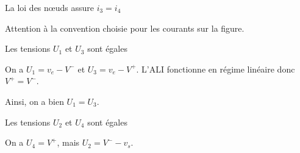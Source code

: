 
\begin{enonce}
  La loi des nœuds assure \(i_{3} = i_{4}\)
\end{enonce}


\begin{corrige}
  Attention à la convention choisie pour les courants sur la figure.
\end{corrige}




\begin{enonce}
  Les tensions \(U_{1}\) et \(U_{3}\) sont égales
\end{enonce}


\begin{corrige}
  On a \(U_{1} = v_{e} - V^{-}\) et \(U_{3} = v_{e} - V^{+}\). L’ALI fonctionne en régime linéaire donc \(V^{+} = V^{-}\). 
  
  Ainsi, on a bien \(U_{1} = U_{3}\).
\end{corrige}




\begin{enonce}
  Les tensions \(U_{2}\) et \(U_{4}\) sont égales
\end{enonce}


\begin{corrigeNewpage}
  On a \(U_{4} = V^{+}\), mais \(U_{2}=V^{-} - v_{s}\).
\end{corrigeNewpage}



\finEntrainement







